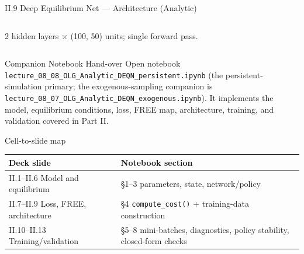 \documentclass[aspectratio=169,11pt]{beamer}
\newcommand{\emphc}[1]{\textcolor{harvardcrimson}{#1}}
\begin{document}
\begin{frame}{II.9 Deep Equilibrium Net --- Architecture (Analytic)}
\begin{columns}[T,totalwidth=0.96\textwidth]

{\footnotesize 2 hidden layers $\times$ (100, 50) units; single forward pass.}
\end{columns}
\end{frame}


\begin{frame}{Companion Notebook Hand-over}
\scriptsize
\emphc{Open notebook \texttt{lecture\_08\_08\_OLG\_Analytic\_DEQN\_persistent.ipynb}} (the persistent-simulation primary; the exogenous-sampling companion is \texttt{lecture\_08\_07\_OLG\_Analytic\_DEQN\_exogenous.ipynb}).  It implements the model, equilibrium conditions, loss, FREE map, architecture, training, and validation covered in Part II.
\vspace{-2pt}
\begin{block}{Cell-to-slide map}
\vspace{-4pt}
\begin{center}\renewcommand{\arraystretch}{0.85}
{\scriptsize
\begin{tabular}{ll}
\toprule
\textbf{Deck slide} & \textbf{Notebook section} \\
\midrule
II.1--II.6 Model and equilibrium        & \S 1--3 \;parameters, state, network/policy \\
II.7--II.9 Loss, FREE, architecture     & \S 4 \;\texttt{compute\_cost()} + training-data construction \\
II.10--II.13 Training/validation        & \S 5--8 \;mini-batches, diagnostics, policy stability, closed-form checks \\
\bottomrule
\end{tabular}}
\end{center}
\vspace{-4pt}
\end{block}
\end{frame}
\end{document}
